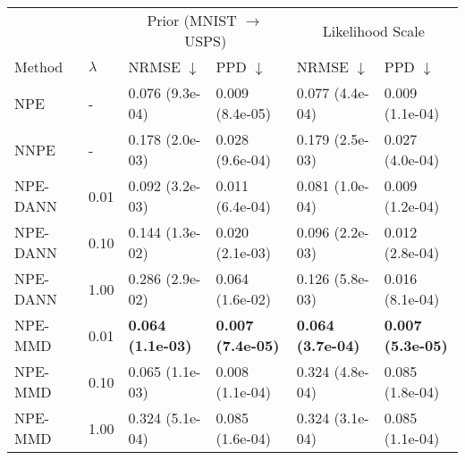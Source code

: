     \begin{tabular}{ ll |ll|ll}
     \toprule
            &           & \multicolumn{2}{c}{Prior (MNIST $\rightarrow$ USPS)} & \multicolumn{2}{c}{Likelihood Scale} \\
     Method & $\lambda$ & NRMSE $\downarrow$ & PPD $\downarrow$ & NRMSE $\downarrow$ & PPD $\downarrow$  \\
     \midrule
NPE & - & \cellcolor{lime!95} 0.076 (9.3e-04) & \cellcolor{lime!98} 0.009 (8.4e-05) & \cellcolor{lime!94} 0.077 (4.4e-04) & \cellcolor{lime!97} 0.009 (1.1e-04) \vspace{0.1cm}\\
NNPE & - & \cellcolor{lime!56} 0.178 (2.0e-03) & \cellcolor{lime!73} 0.028 (9.6e-04) & \cellcolor{lime!55} 0.179 (2.5e-03) & \cellcolor{lime!74} 0.027 (4.0e-04) \vspace{0.1cm}\\
NPE-DANN & 0.01 & \cellcolor{lime!89} 0.092 (3.2e-03) & \cellcolor{lime!95} 0.011 (6.4e-04) & \cellcolor{lime!93} 0.081 (1.0e-04) & \cellcolor{lime!97} 0.009 (1.2e-04) \\
NPE-DANN & 0.10 & \cellcolor{lime!69} 0.144 (1.3e-02) & \cellcolor{lime!84} 0.020 (2.1e-03) & \cellcolor{lime!87} 0.096 (2.2e-03) & \cellcolor{lime!94} 0.012 (2.8e-04) \\
NPE-DANN & 1.00 & \cellcolor{lime!14} 0.286 (2.9e-02) & \cellcolor{lime!27} 0.064 (1.6e-02) & \cellcolor{lime!76} 0.126 (5.8e-03) & \cellcolor{lime!89} 0.016 (8.1e-04) \vspace{0.1cm}\\
NPE-MMD & 0.01 & \cellcolor{lime!100} \textbf{0.064 (1.1e-03)} & \cellcolor{lime!100} \textbf{0.007 (7.4e-05)} & \cellcolor{lime!100} \textbf{0.064 (3.7e-04)} & \cellcolor{lime!100} \textbf{0.007 (5.3e-05)} \\
NPE-MMD & 0.10 & \cellcolor{lime!99} 0.065 (1.1e-03) & \cellcolor{lime!99} 0.008 (1.1e-04) & \cellcolor{lime!0} 0.324 (4.8e-04) & \cellcolor{lime!0} 0.085 (1.8e-04) \\
NPE-MMD & 1.00 & \cellcolor{lime!0} 0.324 (5.1e-04) & \cellcolor{lime!0} 0.085 (1.6e-04) & \cellcolor{lime!0} 0.324 (3.1e-04) & \cellcolor{lime!0} 0.085 (1.1e-04) \vspace{0.1cm}\\

     \hline
    \end{tabular}
